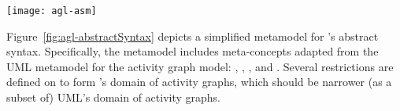 %
%
\begin{figure*}[ht]
	\vspace{-0.1cm}	
	\begin{center}
		\texttt{[image: agl-asm]}
	\end{center}
	\vspace{-0.6cm}
	\caption{A simplified metamodel for AGL's abstract syntax.} %
	\label{fig:agl-abstractSyntax}
	\vspace{-0.2cm}
\end{figure*}
%
Figure~\ref{fig:agl-abstractSyntax} depicts a simplified metamodel for \agl's abstract syntax. Specifically, the \agl metamodel includes meta-concepts adapted from the UML metamodel for the activity graph model: , , , and . Several restrictions are defined on  to form \agl's domain of activity graphs, which should be narrower (as a subset of) UML's domain of activity graphs.

